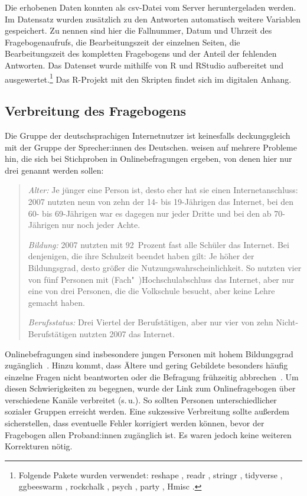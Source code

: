 Die erhobenen Daten konnten als csv-Datei vom Server heruntergeladen werden. Im Datensatz wurden zusätzlich zu den Antworten automatisch weitere Variablen gespeichert. Zu nennen sind hier die Fallnummer, Datum und Uhrzeit des Fragebogenaufrufs, die Bearbeitungszeit der einzelnen Seiten, die Bearbeitungszeit des kompletten Fragebogens und der Anteil der fehlenden Antworten. Das Datenset wurde mithilfe von R \citep[][Version 3.6.1]{RCoreTeam2019} und RStudio \citep[][Version 1.2.5033]{RStudio.2019} aufbereitet und ausgewertet.\footnote{Folgende Pakete wurden verwendet: 
reshape \citep[][Version 0.8.8]{Wickham.2018}, 
readr \citep[][Version 1.3.1]{Wickham.2018b},
stringr \citep[][Version 1.4.0]{Wickham.2019}, 
tidyverse \citep[][Version 1.3.0]{Wickham.2019b},
ggbeeswarm \citep[][Version 0.6.0]{Clarke.2017}, 
rockchalk \citep[][Version 1.8.144]{Johnson.2019},
psych \citep[][Version 2.0.7]{Revelle2016},
party \citep[][Version 1.3-4]{Hothorn.2010},
Hmisc \citep[][Version 4.4-0]{Harrell.2020}.} 
Das R-Projekt mit den Skripten findet sich im digitalen Anhang. 
\subsection{Verbreitung des Fragebogens}
\label{sec:VerbreitungFragebogen}
Die Gruppe der deutschsprachigen Internetnutzer ist keinesfalls deckungsgleich mit der Gruppe der Sprecher:innen des Deutschen. \citet{Baur2009} weisen auf mehrere Probleme hin, die sich bei Stichproben in Onlinebefragungen ergeben, von denen hier nur drei genannt werden sollen:
\begin{quote}\textit{Alter: }Je jünger eine Person ist, desto eher hat sie einen Internetanschluss: 2007 nutzten neun von zehn der 14- bis 19-Jährigen das Internet, bei den 60- bis 69-Jährigen war es dagegen nur jeder Dritte und bei den ab 70-Jährigen nur noch jeder Achte.

\textit{Bildung: }2007 nutzten mit 92~Prozent fast alle Schüler das Internet. Bei denjenigen, die ihre Schulzeit beendet haben gilt: Je höher der Bildungsgrad, desto größer die Nutzungswahrscheinlichkeit. So nutzten vier von fünf Personen mit (Fach"~)Hochschulabschluss das Internet, aber nur eine von drei Personen, die die Volkschule besucht, aber keine Lehre gemacht haben.

\textit{Berufsstatus: }Drei Viertel der Berufstätigen, aber nur vier von zehn Nicht-Berufstätigen nutzten 2007 das Internet.~\citep[112--113]{Baur2009}\end{quote}
Onlinebefragungen sind insbesondere jungen Personen mit hohem Bildungsgrad zug{\"a}nglich~\citep[s.][114]{Baur2009}.
Hinzu kommt, \glqq dass {\"A}ltere und gering Gebildete besonders h{\"a}ufig einzelne Fragen nicht beantworten oder die Befragung fr{\"u}hzeitig abbrechen\grqq{}~\citep[123]{Baur2009}.
Um diesen Schwierigkeiten zu begegnen, wurde der Link zum Onlinefragebogen über verschiedene Kanäle verbreitet (s.\,u.). So sollten Personen unterschiedlicher sozialer Gruppen erreicht werden. Eine sukzessive Verbreitung sollte außerdem sicherstellen, dass eventuelle Fehler korrigiert werden können, bevor der Fragebogen allen Proband:innen zugänglich ist. Es waren jedoch keine weiteren Korrekturen nötig.

